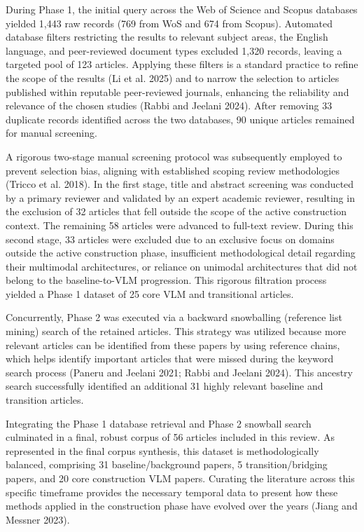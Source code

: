 \documentclass[10pt]{article}
\begin{document}
During Phase 1, the initial query across the Web of Science and Scopus databases yielded 1,443 raw records (769 from WoS and 674 from Scopus). Automated database filters restricting the results to relevant subject areas, the English language, and peer-reviewed document types excluded 1,320 records, leaving a targeted pool of 123 articles. Applying these filters is a standard practice to refine the scope of the results (Li et al. 2025) and to narrow the selection to articles published within reputable peer-reviewed journals, enhancing the reliability and relevance of the chosen studies (Rabbi and Jeelani 2024). After removing 33 duplicate records identified across the two databases, 90 unique articles remained for manual screening.

A rigorous two-stage manual screening protocol was subsequently employed to prevent selection bias, aligning with established scoping review methodologies (Tricco et al. 2018). In the first stage, title and abstract screening was conducted by a primary reviewer and validated by an expert academic reviewer, resulting in the exclusion of 32 articles that fell outside the scope of the active construction context. The remaining 58 articles were advanced to full-text review. During this second stage, 33 articles were excluded due to an exclusive focus on domains outside the active construction phase, insufficient methodological detail regarding their multimodal architectures, or reliance on unimodal architectures that did not belong to the baseline-to-VLM progression. This rigorous filtration process yielded a Phase 1 dataset of 25 core VLM and transitional articles.

Concurrently, Phase 2 was executed via a backward snowballing (reference list mining) search of the retained articles. This strategy was utilized because more relevant articles can be identified from these papers by using reference chains, which helps identify important articles that were missed during the keyword search process (Paneru and Jeelani 2021; Rabbi and Jeelani 2024). This ancestry search successfully identified an additional 31 highly relevant baseline and transition articles.

Integrating the Phase 1 database retrieval and Phase 2 snowball search culminated in a final, robust corpus of 56 articles included in this review. As represented in the final corpus synthesis, this dataset is methodologically balanced, comprising 31 baseline/background papers, 5 transition/bridging papers, and 20 core construction VLM papers. Curating the literature across this specific timeframe provides the necessary temporal data to present how these methods applied in the construction phase have evolved over the years (Jiang and Messner 2023).
\end{document}
